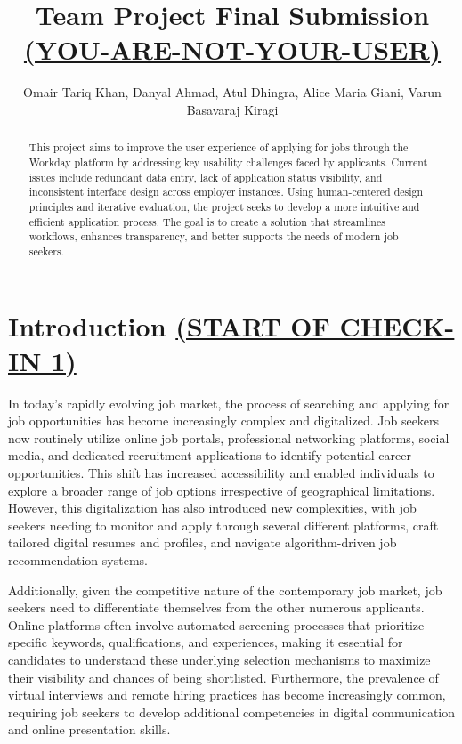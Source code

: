 \documentclass[
	letterpaper, %
]{jdf}
\author{Omair Tariq Khan, Danyal Ahmad, Atul Dhingra, Alice Maria Giani, Varun Basavaraj Kiragi}
\title{Team Project Final Submission \underline{\textbf{(YOU-ARE-NOT-YOUR-USER)}}}
\begin{document}

\maketitle
\begin{sloppypar}


\begin{abstract}
	This project aims to improve the user experience of applying for jobs through the Workday platform by addressing key usability challenges faced by applicants. Current issues include redundant data entry, lack of application status visibility, and inconsistent interface design across employer instances. Using human-centered design principles and iterative evaluation, the project seeks to develop a more intuitive and efficient application process. The goal is to create a solution that streamlines workflows, enhances transparency, and better supports the needs of modern job seekers.
\end{abstract}
\hfill \break
\section{Introduction \underline{(START OF CHECK-IN 1)}}
In today's rapidly evolving job market, the process of searching and applying for job opportunities has become increasingly complex and digitalized. Job seekers now routinely utilize online job portals, professional networking platforms, social media, and dedicated recruitment applications to identify potential career opportunities. This shift has increased accessibility and enabled individuals to explore a broader range of job options irrespective of geographical limitations. However, this digitalization has also introduced new complexities, with job seekers needing to monitor and apply through several different platforms, craft tailored digital resumes and profiles, and navigate algorithm-driven job recommendation systems.

Additionally, given the competitive nature of the contemporary job market, job seekers need to differentiate themselves from the other numerous applicants. Online platforms often involve automated screening processes that prioritize specific keywords, qualifications, and experiences, making it essential for candidates to understand these underlying selection mechanisms to maximize their visibility and chances of being shortlisted. Furthermore, the prevalence of virtual interviews and remote hiring practices has become increasingly common, requiring job seekers to develop additional competencies in digital communication and online presentation skills.


\end{sloppypar}
\end{document}

